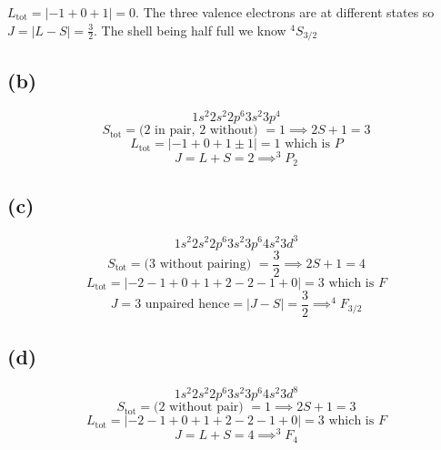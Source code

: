 \documentclass[letter, 10pts]{article}
\begin{document}
$
L_\text{tot} = | -1 + 0 + 1 | = 0 
$. The three valence electrons are at different states so $J = | L - S | = \frac{3}{2}$. The shell being half full we know $^{4} S _{3 / 2}$


\subsection*{(b)} 
\[
1 s ^2 2 s ^2 2 p ^{6} 3 s ^2 3 p ^{4} 
\]
\[
S_\text{tot} = \text{(2 in pair, 2 without)  } = 1 \implies 2 S + 1 = 3
\]
\[
L_\text{tot} = | - 1 + 0 + 1 \pm 1 | = 1  \text{ which is $P$}
\]
\[
J  = L + S = 2 \implies ^{3} P_2
\] 


\subsection*{(c)} 
\[
1 s ^2 2 s ^2 2 p ^{6} 3 s ^2 3 p ^{6} 4 s ^2 3 d ^{3}
\]
\[
S_\text{tot} = \text{(3 without pairing)  } = \frac{3}{2} \implies 2 S + 1 = 4
\]
\[
L_\text{tot} = | - 2 - 1 + 0 + 1 + 2 - 2 - 1 + 0 | = 3  \text{ which is $F$}
\]
\[
	J  = \text{3 unpaired hence} = | J - S |  = \frac{3}{2} \implies ^{4} F_{3 / 2}
\]


\subsection*{(d)} 
\[
1 s ^2 2 s ^2 2 p ^{6} 3 s ^2 3 p ^{6} 4 s ^2 3 d ^{8}
\]
\[
S_\text{tot} = \text{(2 without pair)  } = 1 \implies 2 S + 1 = 3
\]
\[
L_\text{tot} = | - 2 - 1 + 0 + 1 + 2 - 2 - 1 + 0 | = 3  \text{ which is $F$}
\]
\[
J  = L + S = 4 \implies ^{3} F_4
\]
\end{document}
